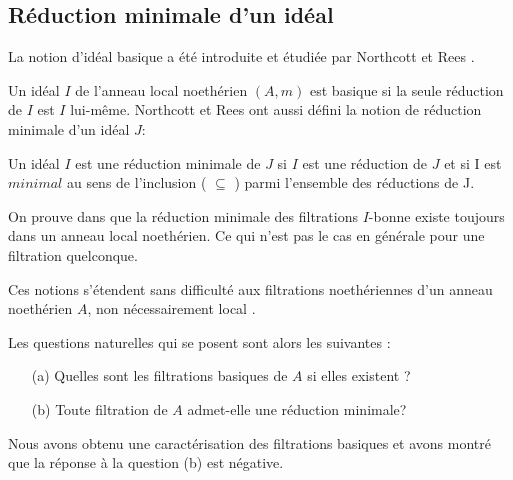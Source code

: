 \subsection{Réduction minimale d'un idéal}
La notion d'idéal basique a été introduite et étudiée par Northcott et Rees \cite{4}.
\begin{madefinition}
	Un idéal $I$ de l'anneau local noethérien $(A,m)$ est basique si la seule réduction de $I$ est $I$ lui-m\^{e}me. 
	Northcott et Rees ont aussi défini la notion de réduction minimale
	d'un idéal $J$:
	
	Un idéal $I$ est une réduction minimale de $J$ si $I$ est une réduction de $J$ et si I est $minimal$ au sens de l'inclusion ( $\subseteq$ ) parmi l'ensemble des réductions de J. 
\end{madefinition}
\begin{maremarque}
	On prouve dans \cite{2} que la réduction minimale des filtrations $I$-bonne existe toujours dans un anneau local noethérien. Ce qui n'est pas le cas en générale pour une filtration quelconque.
\end{maremarque}
Ces notions s'étendent sans difficulté aux filtrations noethériennes d'un anneau noethérien $A$, non nécessairement local \cite{2}. 

Les questions naturelles qui se posent sont alors les suivantes :
\begin{enumerate}
	\item[(a)] Quelles sont les filtrations basiques de $A$ si elles existent ?
	\item[(b)] Toute filtration de $A$ admet-elle une réduction minimale?
\end{enumerate}

Nous avons obtenu une caractérisation des filtrations basiques et avons montré que la réponse à la question (b) est négative.

